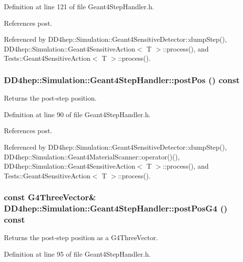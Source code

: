 Definition at line 121 of file Geant4StepHandler.h.

References post.

Referenced by DD4hep::Simulation::Geant4SensitiveDetector::dumpStep(), DD4hep::Simulation::Geant4SensitiveAction$<$ T $>$::process(), and Tests::Geant4SensitiveAction$<$ T $>$::process().\hypertarget{class_d_d4hep_1_1_simulation_1_1_geant4_step_handler_a93fb68b4ef3a4172a19b483d77d87b01}{
\subsubsection[{postPos}]{ DD4hep::Simulation::Geant4StepHandler::postPos () const}}
\label{class_d_d4hep_1_1_simulation_1_1_geant4_step_handler_a93fb68b4ef3a4172a19b483d77d87b01}


Returns the post-\/step position. 

Definition at line 90 of file Geant4StepHandler.h.

References post.

Referenced by DD4hep::Simulation::Geant4SensitiveDetector::dumpStep(), DD4hep::Simulation::Geant4MaterialScanner::operator()(), DD4hep::Simulation::Geant4SensitiveAction$<$ T $>$::process(), and Tests::Geant4SensitiveAction$<$ T $>$::process().\hypertarget{class_d_d4hep_1_1_simulation_1_1_geant4_step_handler_a41cd79af212c7cab9d2bb5a9d070bf0f}{
\subsubsection[{postPosG4}]{\setlength{\rightskip}{0pt plus 5cm}const G4ThreeVector\& DD4hep::Simulation::Geant4StepHandler::postPosG4 () const}}
\label{class_d_d4hep_1_1_simulation_1_1_geant4_step_handler_a41cd79af212c7cab9d2bb5a9d070bf0f}


Returns the post-\/step position as a G4ThreeVector. 

Definition at line 95 of file Geant4StepHandler.h.

